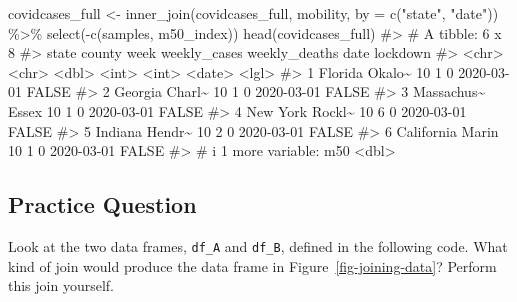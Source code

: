\documentclass[
  letterpaper,
]{latex/krantz}
\makeatletter
\newenvironment{Shaded}{\begin{snugshade}}{\end{snugshade}}
\newcommand{\AttributeTok}[1]{\textcolor[rgb]{0.40,0.45,0.13}{#1}}
\newcommand{\CommentTok}[1]{\textcolor[rgb]{0.37,0.37,0.37}{#1}}
\newcommand{\FunctionTok}[1]{\textcolor[rgb]{0.28,0.35,0.67}{#1}}
\newcommand{\NormalTok}[1]{\textcolor[rgb]{0.00,0.23,0.31}{#1}}
\newcommand{\OtherTok}[1]{\textcolor[rgb]{0.00,0.23,0.31}{#1}}
\newcommand{\SpecialCharTok}[1]{\textcolor[rgb]{0.37,0.37,0.37}{#1}}
\newcommand{\StringTok}[1]{\textcolor[rgb]{0.13,0.47,0.30}{#1}}
\newenvironment{kframe}{%
\medskip{}
\setlength{\fboxsep}{.8em}
 \def\at@end@of@kframe{}%
 \ifinner\ifhmode%
  \def\at@end@of@kframe{\end{minipage}}%
  \begin{minipage}{\columnwidth}%
 \fi\fi%
 \def\FrameCommand##1{\hskip\@totalleftmargin \hskip-\fboxsep
 \colorbox{shadecolor}{##1}\hskip-\fboxsep
     \hskip-\linewidth \hskip-\@totalleftmargin \hskip\columnwidth}%
 \MakeFramed {\advance\hsize-\width
   \@totalleftmargin\z@ \linewidth\hsize
   \@setminipage}}%
 {\par\unskip\endMakeFramed%
 \at@end@of@kframe}
\renewenvironment{Shaded}{\begin{kframe}}{\end{kframe}}
\makeatother
\begin{document}
\begin{Shaded}
\begin{Highlighting}[]
\NormalTok{covidcases\_full }\OtherTok{\textless{}{-}} \FunctionTok{inner\_join}\NormalTok{(covidcases\_full, mobility, }
                              \AttributeTok{by =} \FunctionTok{c}\NormalTok{(}\StringTok{"state"}\NormalTok{, }\StringTok{"date"}\NormalTok{)) }\SpecialCharTok{\%\textgreater{}\%}
  \FunctionTok{select}\NormalTok{(}\SpecialCharTok{{-}}\FunctionTok{c}\NormalTok{(samples, m50\_index))}
\FunctionTok{head}\NormalTok{(covidcases\_full)}
\CommentTok{\#\textgreater{} \# A tibble: 6 x 8}
\CommentTok{\#\textgreater{}   state      county  week weekly\_cases weekly\_deaths date       lockdown}
\CommentTok{\#\textgreater{}   \textless{}chr\textgreater{}      \textless{}chr\textgreater{}  \textless{}dbl\textgreater{}        \textless{}int\textgreater{}         \textless{}int\textgreater{} \textless{}date\textgreater{}     \textless{}lgl\textgreater{}   }
\CommentTok{\#\textgreater{} 1 Florida    Okalo\textasciitilde{}    10            1             0 2020{-}03{-}01 FALSE   }
\CommentTok{\#\textgreater{} 2 Georgia    Charl\textasciitilde{}    10            1             0 2020{-}03{-}01 FALSE   }
\CommentTok{\#\textgreater{} 3 Massachus\textasciitilde{} Essex     10            1             0 2020{-}03{-}01 FALSE   }
\CommentTok{\#\textgreater{} 4 New York   Rockl\textasciitilde{}    10            6             0 2020{-}03{-}01 FALSE   }
\CommentTok{\#\textgreater{} 5 Indiana    Hendr\textasciitilde{}    10            2             0 2020{-}03{-}01 FALSE   }
\CommentTok{\#\textgreater{} 6 California Marin     10            1             0 2020{-}03{-}01 FALSE   }
\CommentTok{\#\textgreater{} \# i 1 more variable: m50 \textless{}dbl\textgreater{}}
\end{Highlighting}
\end{Shaded}

\subsection{Practice Question}\label{practice-question-12}

Look at the two data frames, \texttt{df\_A} and \texttt{df\_B}, defined
in the following code. What kind of join would produce the data frame in
Figure~\ref{fig-joining-data}? Perform this join yourself.
\end{document}
